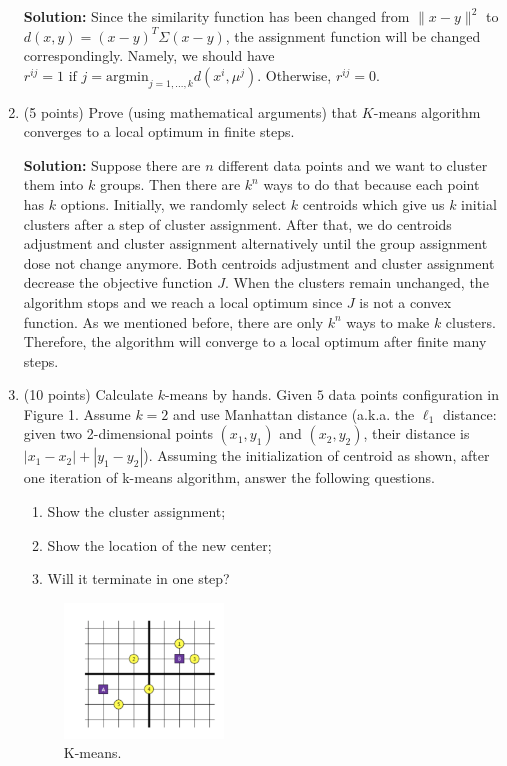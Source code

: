 \documentclass[twoside,10pt]{article}
\begin{document}
\begin{enumerate}
   \begin{tcolorbox}
   \textbf{Solution:} Since the similarity function has been changed from $\|x-y\|^2$ to $d(x,y) = (x-y)^T\Sigma(x-y)$, the assignment function will be changed correspondingly. Namely, we should have
   $r^{ij} = 1 \text{ if } j = \text{argmin}_{j=1,...,k}d(x^i,\mu^j).$ Otherwise, $r^{ij} =0$.
   \end{tcolorbox}
   
   
\item (5 points) Prove (using mathematical arguments) that $K$-means algorithm converges to a local optimum in finite steps.

\begin{tcolorbox}
\textbf{Solution:} Suppose there are $n$ different data points and we want to cluster them into $k$ groups. Then there are $k^n$ ways to do that because each point has $k$ options. Initially, we randomly select $k$ centroids which give us $k$ initial clusters after a step of cluster assignment. After that, we do centroids adjustment and cluster assignment alternatively until the group assignment dose not change anymore. Both centroids adjustment and cluster assignment decrease the objective function $J$. When the clusters remain unchanged, the algorithm stops and we reach a local optimum since $J$ is not a convex function. As we mentioned before, there are only $k^n$ ways to make $k$ clusters. Therefore, the algorithm will converge to a local optimum after finite many steps.
\end{tcolorbox}

\item (10 points) Calculate $k$-means by hands.  Given $5$ data points configuration in Figure 1. Assume $k = 2$ and use Manhattan distance (a.k.a. the $\ell_1$ distance: given two 2-dimensional points $(x_1, y_1)$ and $(x_2, y_2)$, their distance is $|x_1 - x_2| + |y_1 - y_2|$).  Assuming the initialization of centroid as shown, after one iteration of k-means algorithm, answer the following questions. 

\begin{enumerate}
\item Show the cluster assignment;
\item Show the location of the new center;
\item Will it terminate in one step?
\end{enumerate}

\begin{figure}[h!]
\begin{center}
\includegraphics[width = 0.4\textwidth]{points.png}
\end{center}
\caption{K-means.}
\end{figure}


\end{enumerate}
\end{document}
